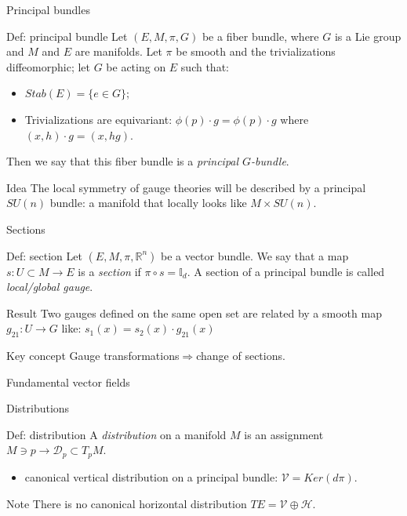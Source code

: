 \documentclass{beamer}
\begin{document}
\begin{frame}{Principal bundles}
	\begin{exampleblock}{Def: principal bundle}
		Let $(E,M,\pi,G)$ be a fiber bundle, where $G$ is a Lie group and $M$ and $E$ are manifolds. Let $\pi$ be smooth and the trivializations diffeomorphic; let $G$ be acting on $E$ such that:
		\begin{itemize}
			\item $Stab(E)=\{e\in G\}$;
			\item Trivializations are equivariant: $\phi(p)\cdot g=\phi(p)\cdot g$ where $(x,h)\cdot g=(x,hg)$.
		\end{itemize} 
		Then we say that this fiber bundle is a \textit{principal $G$-bundle}.
	\end{exampleblock}
	\begin{block}{Idea}
		The local symmetry of gauge theories will be described by a principal $SU(n)$ bundle: a manifold that locally looks like $M\times SU(n)$.
	\end{block}
\end{frame}
\begin{frame}{Sections}
	\begin{exampleblock}{Def: section}
			Let $(E,M,\pi,\mathbb{R}^n)$ be a vector bundle. We say that a map \\$s:U\subset M\rightarrow E$ is a \textit{section} if $\pi\circ s=\mathbb{I}_d$. A section of a principal bundle is called \textit{local/global gauge}.
	\end{exampleblock}
	\begin{block}{Result}
		Two gauges defined on the same open set are related by a smooth map $g_{21}:U\rightarrow G$ like: $s_1(x)=s_2(x)\cdot g_{21}(x)$
	\end{block}
	\begin{alertblock}{Key concept}
		Gauge transformations$\Longrightarrow$change of sections.
	\end{alertblock}
\end{frame}
\begin{frame}{Fundamental vector fields}
	
\end{frame}
\begin{frame}{Distributions}
	\begin{exampleblock}{Def: distribution}
			A \textit{distribution} on a manifold $M$ is an assignment $M\ni p\rightarrow \mathcal{D}_p\subset T_pM$.
			\begin{itemize}
				\item canonical vertical distribution on a principal bundle: $\mathcal{V}=Ker(d\pi)$.
			\end{itemize}
	\end{exampleblock}
	\begin{alertblock}{Note}
		There is no canonical horizontal distribution $TE=\mathcal{V}\oplus\mathcal{H}$.
	\end{alertblock}
\end{frame}
\end{document}
